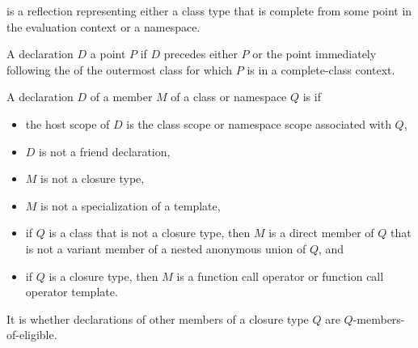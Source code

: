 \begin{itemdescr}
\pnum
\constantwhen
{} is a reflection representing either
a class type that is complete from some point in the evaluation context
or a namespace.

\pnum
A declaration $D$  a point $P$
if $D$ precedes either $P$
or the point immediately following the 
of the outermost class for which $P$ is in a complete-class context.

\pnum
A declaration $D$ of a member $M$ of a class or namespace $Q$ is
 if
\begin{itemize}
\item
  the host scope of $D$
  is the class scope or namespace scope associated with $Q$,
\item
  $D$ is not a friend declaration,
\item
  $M$ is not a closure type,
\item
  $M$ is not a specialization of a template,
\item
  if $Q$ is a class that is not a closure type,
  then $M$ is a direct member of $Q$
  that is not a variant member of a
  nested anonymous union of $Q$, and
\item
  if $Q$ is a closure type,
  then $M$ is a function call operator or function call operator template.
\end{itemize}
It is 
whether declarations of other members of a closure type $Q$
are $Q$-members-of-eligible.


\end{itemdescr}
